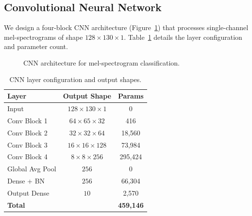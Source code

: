 \documentclass[10pt,journal]{IEEEtran}
\begin{document}
\subsection{Convolutional Neural Network}

We design a four-block CNN architecture (Figure~\ref{fig:cnn_arch}) that processes single-channel mel-spectrograms of shape $128 \times 130 \times 1$. Table~\ref{tab:cnn_arch} details the layer configuration and parameter count.

\begin{figure}[ht]
\centering
{}
\caption{CNN architecture for mel-spectrogram classification.}
\label{fig:cnn_arch}
\end{figure}

\begin{table}[ht]
\centering
\caption{CNN layer configuration and output shapes.}
\label{tab:cnn_arch}
\begin{tabular}{@{}lcc@{}}
\toprule
\textbf{Layer} & \textbf{Output Shape} & \textbf{Params} \\
\midrule
Input          & $128 \times 130 \times 1$ & 0 \\
Conv Block 1   & $64 \times 65 \times 32$  & 416 \\
Conv Block 2   & $32 \times 32 \times 64$  & 18,560 \\
Conv Block 3   & $16 \times 16 \times 128$ & 73,984 \\
Conv Block 4   & $8 \times 8 \times 256$   & 295,424 \\
Global Avg Pool & $256$                    & 0 \\
Dense + BN     & $256$                     & 66,304 \\
Output Dense   & $10$                      & 2,570 \\
\midrule
\textbf{Total} & & \textbf{459,146} \\
\bottomrule
\end{tabular}
\end{table}
\end{document}
